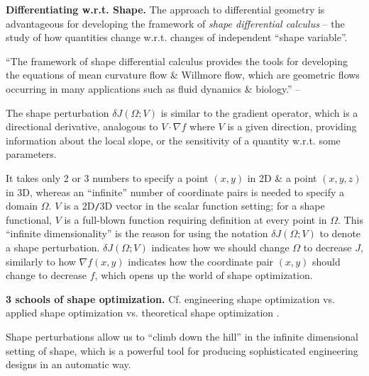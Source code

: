 \documentclass{article}
\begin{document}
\begin{enumerate}
	{\bf Differentiating w.r.t. Shape.} The approach to differential geometry is advantageous for developing the framework of {\it shape differential calculus} -- the study of how quantities change w.r.t. changes of independent ``shape variable''.
	
	``The framework of shape differential calculus provides the tools for developing the equations of mean curvature flow \& Willmore flow, which are geometric flows occurring in many applications such as fluid dynamics \& biology.'' -- \cite[p. 2]{Walker2015}
	
	The shape perturbation $\delta J(\Omega;V)$ is similar to the gradient operator, which is a directional derivative, analogous to $V\cdot\nabla f$ where $V$ is a given direction, providing information about the local slope, or the sensitivity of a quantity w.r.t. some parameters.
	
	It takes only 2 or 3 numbers to specify a point $(x,y)$ in 2D \& a point $(x,y,z)$ in 3D, whereas an ``infinite'' number of coordinate pairs is needed to specify a domain $\Omega$. $V$ is a 2D{\tt/}3D vector in the scalar function setting; for a shape functional, $V$ is a full-blown function requiring definition at every point in $\Omega$. This ``infinite dimensionality'' is the reason for using the notation $\delta J(\Omega;V)$ to denote a shape perturbation. $\delta J(\Omega;V)$ indicates how we should change $\Omega$ to decrease $J$, similarly to how $\nabla f(x,y)$ indicates how the coordinate pair $(x,y)$ should change to decrease $f$, which opens up the world of shape optimization.
	
	{\bf3 schools of shape optimization.} Cf. engineering shape optimization vs. applied shape optimization \cite{Mohammadi_Pironneau2010} vs. theoretical shape optimization \cite{Sokolowski_Zolesio1992,Delfour_Zolesio2011}.
	
	Shape perturbations allow us to ``climb down the hill'' in the infinite dimensional setting of shape, which is a powerful tool for producing sophisticated engineering designs in an automatic way.
	

\end{enumerate}
\end{document}
